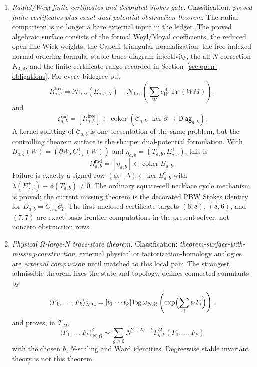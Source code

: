 \begin{enumerate}
  \item \emph{Radial/Weyl finite certificates and decorated Stokes gate.}
  Classification: \emph{proved finite certificates plus exact
  dual-potential obstruction theorem}.  The radial comparison is no longer a
  bare external input in the ledger.  The proved algebraic surface
  consists of the formal Weyl/Moyal coefficients, the reduced open-line
  Wick weights, the Capelli triangular normalization, the free indexed
  normal-ordering formula, stable trace-diagram injectivity, the all-\(N\)
  correction \(K_{4,4}\), and the finite certificate range recorded in
  Section~\ref{sec:open-obligations}.  For every bidegree put
  \[
    R^{\mathrm{free}}_{a,b}
    =
    \mathcal N_{\mathrm{free}}(E_{a,b,N})
    -
    \mathcal N_{\mathrm{free}}
    \left(\sum_W c^{\mathrm{cl}}_W\operatorname{Tr}(WM)\right),
  \]
  and
  \[
    \mathfrak o^{\mathrm{rad}}_{a,b}
    =
    [R^{\mathrm{free}}_{a,b}]
    \in
    \operatorname{coker}
    \left(
      \mathcal C_{a,b}\colon
      \ker\partial\to\mathsf{Diag}_{a,b}
    \right).
  \]
  A kernel splitting of \(\mathcal C_{a,b}\) is one presentation of the
  same problem, but the controlling theorem surface is the sharper
  dual-potential formulation.  With
  \(B_{a,b}(W)=(\partial W,C^+_{a,b}(W))\) and
  \(\eta_{a,b}=(T_{a,b},E^+_{a,b})\), this is
  \[
    \Omega^{\mathrm{rad}}_{a,b}
      =
    [\eta_{a,b}]\in\operatorname{coker}B_{a,b}.
  \]
  Failure is exactly a signed row
  \((\phi,-\lambda)\in\ker B_{a,b}^*\) with
  \(\lambda(E^+_{a,b})-\phi(T_{a,b})\ne0\).  The ordinary square-cell
  necklace cycle mechanism is proved; the current missing theorem is the
  decorated PBW Stokes identity for
  \(D^\square_{a,b}=C^+_{a,b}\partial_2\).  The first unclosed
  certificate targets \((6,8)\), \((8,6)\), and \((7,7)\) are exact-basis
  frontier computations in the present solver, not nonzero obstruction
  rows.

  \item \emph{Physical \(\Omega\)-large-\(N\) trace-state theorem.}
  Classification: \emph{theorem-surface-with-missing-construction};
  external physical or factorization-homology analogies are
  \emph{external comparison} until matched to this local pair.  The
  strongest admissible theorem fixes the state and topology, defines
  connected cumulants by
  \[
    \langle F_1,\ldots,F_k\rangle^c_{N,\Omega}
    =
    [t_1\cdots t_k]\log\omega_{N,\Omega}
    \left(\exp\Bigl(\sum_i t_iF_i\Bigr)\right),
  \]
  and proves, in \(\mathcal T_\Omega\),
  \[
    \langle F_1,\ldots,F_k\rangle^c_{N,\Omega}
    \sim
    \sum_{g\ge0}N^{2-2g-k}
    F^\Omega_{g;k}(F_1,\ldots,F_k)
  \]
  with the chosen \(\hbar,N\)-scaling and Ward identities.  Degreewise
  stable invariant theory is not this theorem.
\end{enumerate}


